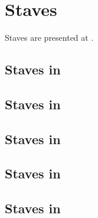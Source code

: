 



\chapter{Staves}

Staves are presented at .


\section{Staves in \mxsrToMsr{}}


\section{Staves in \mxsrToMsr{}}


\section{Staves in \msrToMsr{}}


\section{Staves in \msrToLpsr{}}


\section{Staves in \lpsrToLilypond{}}


